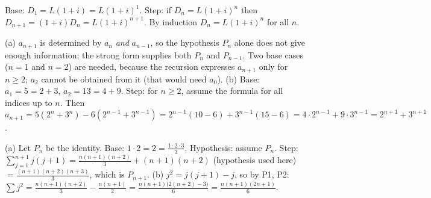 Base: $D_1=L(1+i)=L(1+i)^1$. Step: if $D_n=L(1+i)^n$ then $D_{n+1}=(1+i)D_n=L(1+i)^{n+1}$. By induction $D_n=L(1+i)^n$ for all $n$.

(a) $a_{n+1}$ is determined by $a_n$ \emph{and} $a_{n-1}$, so the hypothesis $P_n$ alone does not give enough information;
the strong form supplies both $P_n$ and $P_{n-1}$. Two base cases ($n=1$ and $n=2$) are needed, because the recursion
expresses $a_{n+1}$ only for $n\ge2$; $a_2$ cannot be obtained from it (that would need $a_0$).
(b) Base: $a_1=5=2+3$, $a_2=13=4+9$. Step: for $n\ge2$, assume the formula for all indices up to $n$. Then
$a_{n+1}=5(2^n+3^n)-6(2^{n-1}+3^{n-1})=2^{n-1}(10-6)+3^{n-1}(15-6)=4\cdot2^{n-1}+9\cdot3^{n-1}=2^{n+1}+3^{n+1}$.

(a) Let $P_n$ be the identity. Base: $1\cdot2=2=\frac{1\cdot2\cdot3}{3}$. Hypothesis: assume $P_n$. Step:
$\sum_{j=1}^{n+1}j(j+1)=\frac{n(n+1)(n+2)}3+(n+1)(n+2)$ (hypothesis used here) $=\frac{(n+1)(n+2)(n+3)}{3}$, which is $P_{n+1}$.
(b) $j^2=j(j+1)-j$, so by P1, P2: $\sum j^2=\frac{n(n+1)(n+2)}3-\frac{n(n+1)}2=\frac{n(n+1)\big(2(n+2)-3\big)}{6}=\frac{n(n+1)(2n+1)}6$.
